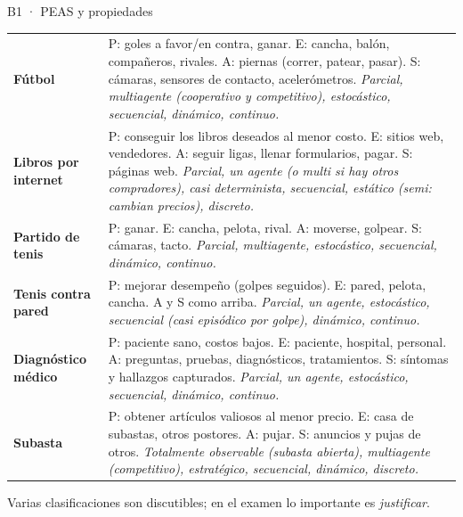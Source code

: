 \begin{solucion}{B1 · PEAS y propiedades}
\renewcommand{\arraystretch}{1.15}
{\small
\begin{tabularx}{\linewidth}{>{\raggedright}p{2.1cm}>{\raggedright\arraybackslash}X}
\toprule
\textbf{Fútbol} & P: goles a favor/en contra, ganar. E: cancha, balón, compañeros, rivales. A: piernas
(correr, patear, pasar). S: cámaras, sensores de contacto, acelerómetros. \emph{Parcial, multiagente
(cooperativo y competitivo), estocástico, secuencial, dinámico, continuo.}\\
\textbf{Libros por internet} & P: conseguir los libros deseados al menor costo. E: sitios web,
vendedores. A: seguir ligas, llenar formularios, pagar. S: páginas web. \emph{Parcial, un agente
(o multi si hay otros compradores), casi determinista, secuencial, estático (semi: cambian precios),
discreto.}\\
\textbf{Partido de tenis} & P: ganar. E: cancha, pelota, rival. A: moverse, golpear. S: cámaras,
tacto. \emph{Parcial, multiagente, estocástico, secuencial, dinámico, continuo.}\\
\textbf{Tenis contra pared} & P: mejorar desempeño (golpes seguidos). E: pared, pelota, cancha. A y S
como arriba. \emph{Parcial, un agente, estocástico, secuencial (casi episódico por golpe),
dinámico, continuo.}\\
\textbf{Diagnóstico médico} & P: paciente sano, costos bajos. E: paciente, hospital, personal. A:
preguntas, pruebas, diagnósticos, tratamientos. S: síntomas y hallazgos capturados. \emph{Parcial,
un agente, estocástico, secuencial, dinámico, continuo.}\\
\textbf{Subasta} & P: obtener artículos valiosos al menor precio. E: casa de subastas, otros postores.
A: pujar. S: anuncios y pujas de otros. \emph{Totalmente observable (subasta abierta), multiagente
(competitivo), estratégico, secuencial, dinámico, discreto.}\\
\bottomrule
\end{tabularx}}

\smallskip
Varias clasificaciones son discutibles; en el examen lo importante es \emph{justificar}.
\end{solucion}

